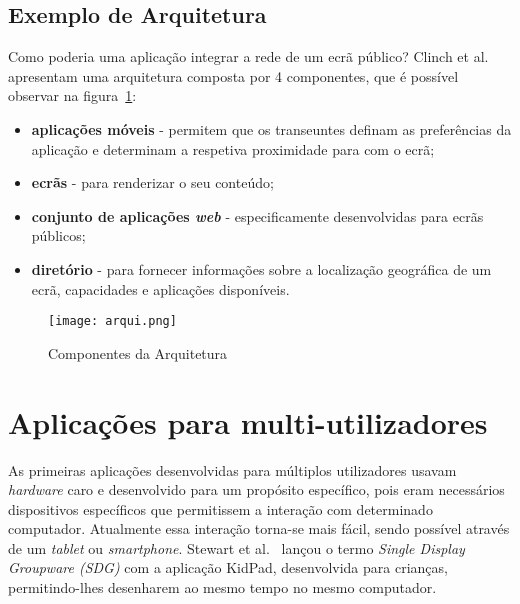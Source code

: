 \subsection{Exemplo de Arquitetura}

Como poderia uma aplicação integrar a rede de um ecrã público? Clinch et al.~\cite{Clinch2012}  apresentam uma arquitetura composta por 4 componentes, que é possível observar na figura~\ref{fig:arquitetura}:

\begin{itemize}
\item \textbf{aplicações móveis} - permitem que os transeuntes definam as preferências da aplicação e determinam a respetiva proximidade para com o ecrã;
\item \textbf{ecrãs} - para renderizar o seu conteúdo;
\item \textbf{conjunto de aplicações \textit{web}} - especificamente desenvolvidas para ecrãs públicos;
\item \textbf{diretório} - para fornecer informações sobre a localização geográfica de um ecrã, 
capacidades e aplicações disponíveis.
\end{itemize}

\begin{figure}[ht]
\centering
\texttt{[image: arqui.png]}
\caption[Componentes da Arquitetura] {Componentes da Arquitetura~\cite{Gehring}}
\label{fig:arquitetura}
\end{figure}


\section{Aplicações para multi-utilizadores}

As primeiras aplicações desenvolvidas para múltiplos utilizadores usavam \textit{hardware} caro e desenvolvido para um propósito específico, pois eram necessários dispositivos específicos que permitissem a interação com determinado computador. Atualmente essa interação torna-se mais fácil, sendo possível através de um \textit{tablet} ou \textit{smartphone}.
Stewart et al.~\cite{stewart1997single} lançou o termo \textit{Single Display Groupware (SDG)} com a aplicação KidPad, desenvolvida para crianças, permitindo-lhes desenharem ao mesmo tempo no mesmo computador.

